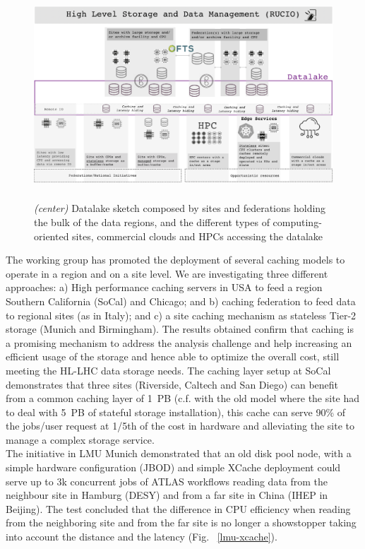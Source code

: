 \begin{figure}
  \centering
  \includegraphics[height=7.8cm]{datalake-sketch-square.png}
  \caption{{\em (center)} Datalake sketch composed by sites and federations holding the bulk of the data regions, and the different types of computing-oriented sites, commercial clouds and HPCs accessing the datalake }
  \label{datalake-sketch}
\end{figure}
The working group has promoted the deployment of several caching models to operate in a region and on a site level. We are investigating three different approaches: a) High performance caching servers in USA to feed a region Southern California (SoCal) and Chicago; and b) caching federation to feed data to regional sites (as in Italy); and c) a site caching mechanism as stateless Tier-2 storage (Munich and Birmingham). The results obtained confirm that caching is a promising mechanism to address the analysis challenge and help increasing an efficient usage of the storage and hence able to optimize the overall cost, still meeting the
HL-LHC data storage needs. The caching layer setup at SoCal demonstrates that three sites (Riverside, Caltech and San Diego) can benefit from a common caching layer of 1~PB (c.f. with the old model where the site had to deal with 5~PB of stateful storage installation), this cache can serve 90\% of the jobs/user request at 1/5th of the cost in hardware and alleviating the site to manage a complex storage service.\\
The initiative in LMU Munich demonstrated that an old disk pool node, with a simple hardware configuration (JBOD) and simple XCache deployment could serve up to 3k concurrent jobs of ATLAS workflows reading data from the neighbour site in Hamburg (DESY) and from a far site in China (IHEP in Beijing). The test concluded that the difference in CPU efficiency when reading from the neighboring site and from the far site is no longer a showstopper taking into account the distance and the latency (Fig. ~\ref{lmu-xcache}).\\

